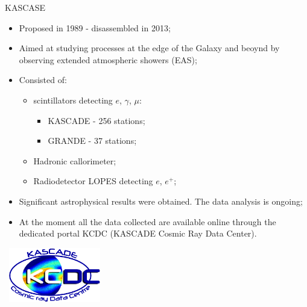 \begin{frame}{KASCASE}
\begin{itemize}
 \item Proposed in 1989 - disassembled in 2013;
 \item Aimed at studying processes at the edge of the Galaxy and beoynd by observing extended atmospheric showers (EAS);
 \item Consisted of: 
 \begin{itemize}
  \item scintillators detecting $e$, $\gamma$, $\mu$:
 \begin{itemize}
    \item KASCADE - 256 stations;
    \item GRANDE - 37 stations; 
 \end{itemize}
    \item Hadronic callorimeter;
    \item Radiodetector LOPES detecting $e$, $e^{+}$;
 \end{itemize}
  \item Significant astrophysical results were obtained. The data analysis is ongoing;
  \item At the moment all the data collected are available online through the dedicated portal KCDC (KASCADE Cosmic Ray Data Center).
\end{itemize}

\parbox[t][0pt]{0pt}{
  \vspace{-0.6\textheight}
  ~\hspace{0.68\textwidth}\includegraphics[width=0.3\textwidth]{pics/KCDC-logo.png}
}
\end{frame}


